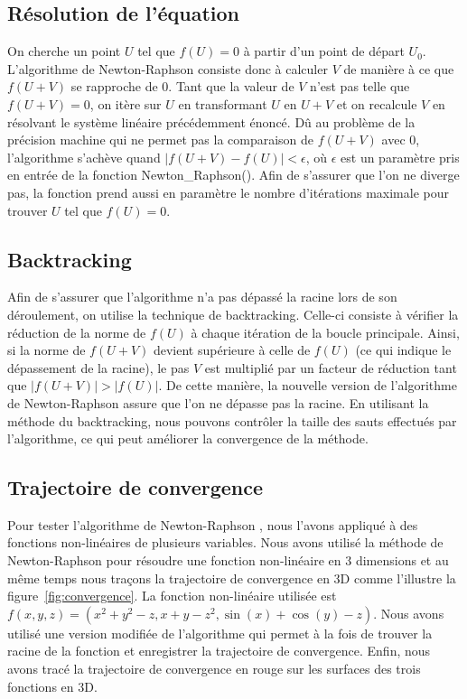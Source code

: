 \documentclass{article}
\begin{document}
 \subsection{Résolution de l'équation}
 On cherche un point $U$ tel que $f(U) = 0$ à partir d'un point de départ $U_0$. L'algorithme de Newton-Raphson consiste donc à calculer $V$ de manière à ce que $f(U+V)$ se rapproche de 0. Tant que la valeur de $V$ n'est pas telle que $f(U+V) = 0$, on itère sur $U$ en transformant $U$ en $U+V$ et on recalcule $V$ en résolvant le système linéaire précédemment énoncé. Dû au problème de la précision machine qui ne permet pas la comparaison de $f(U+V)$ avec 0, l'algorithme s'achève quand $|f(U+V) - f(U)| < \epsilon$, où $\epsilon$ est un paramètre pris en entrée de la fonction Newton\_Raphson(). Afin de s'assurer que l'on ne diverge pas, la fonction prend aussi en paramètre le nombre d'itérations maximale pour trouver $U$ tel que $f(U) = 0$.
 \subsection{Backtracking}
 Afin de s'assurer que l'algorithme n'a pas dépassé la racine lors de son déroulement, on utilise la technique de backtracking. Celle-ci consiste à vérifier la réduction de la norme de $f(U)$ à chaque itération de la boucle principale. Ainsi, si la norme de $f(U+V)$ devient supérieure à celle de $f(U)$ (ce qui indique le dépassement de la racine), le pas $V$ est multiplié par un facteur de réduction tant que $|f(U+V)| > |f(U)|$. De cette manière, la nouvelle version de l'algorithme de Newton-Raphson assure que l'on ne dépasse pas la racine. En utilisant la méthode du backtracking, nous pouvons contrôler la taille des sauts effectués par l'algorithme, ce qui peut améliorer la convergence de la méthode.
 \subsection{Trajectoire de convergence}
Pour tester l'algorithme de Newton-Raphson , nous l'avons appliqué à des fonctions non-linéaires de plusieurs variables. Nous avons utilisé la méthode de Newton-Raphson pour résoudre une fonction non-linéaire en 3 dimensions et au même temps nous traçons la trajectoire de convergence en 3D comme l'illustre la figure~\ref{fig:convergence}. La fonction non-linéaire utilisée est $f(x,y,z) = (x^2 + y^2 - z, x + y - z^2, \sin(x) + \cos(y) - z)$. Nous avons utilisé une version modifiée de l'algorithme qui permet à la fois de trouver la racine de la fonction et enregistrer la trajectoire de convergence. Enfin, nous avons tracé la trajectoire de convergence en rouge sur les surfaces des trois fonctions en 3D. 
\end{document}
